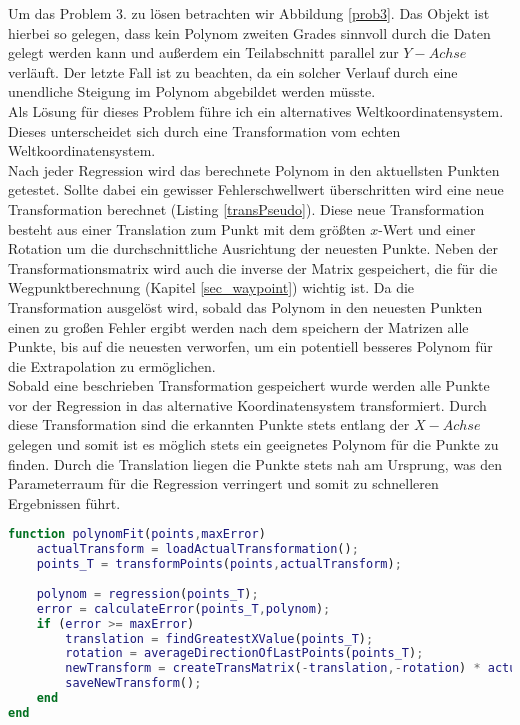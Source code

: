 Um das Problem 3. zu lösen betrachten wir Abbildung \ref{prob3}. Das Objekt ist hierbei so gelegen, dass kein Polynom zweiten Grades sinnvoll durch die Daten gelegt werden kann und außerdem ein Teilabschnitt parallel zur $Y-Achse$ verläuft. Der letzte Fall ist zu beachten, da ein solcher Verlauf durch eine unendliche Steigung im Polynom abgebildet werden müsste.\\
Als Lösung für dieses Problem führe ich ein alternatives Weltkoordinatensystem. Dieses unterscheidet sich durch eine Transformation vom echten Weltkoordinatensystem.\\
Nach jeder Regression wird das berechnete Polynom in den aktuellsten Punkten getestet. Sollte dabei ein gewisser Fehlerschwellwert überschritten wird eine neue Transformation berechnet (Listing \ref{transPseudo}). Diese neue Transformation besteht aus einer Translation zum Punkt mit dem größten $x$-Wert und einer Rotation um die durchschnittliche Ausrichtung der neuesten Punkte. Neben der Transformationsmatrix wird auch die inverse der Matrix gespeichert, die für die Wegpunktberechnung (Kapitel \ref{sec_waypoint}) wichtig ist. Da die Transformation ausgelöst wird, sobald das Polynom in den neuesten Punkten einen zu großen Fehler ergibt werden nach dem speichern der Matrizen alle Punkte, bis auf die neuesten verworfen, um ein potentiell besseres Polynom für die Extrapolation zu ermöglichen.\\
Sobald eine beschrieben Transformation gespeichert wurde werden alle Punkte vor der Regression in das alternative Koordinatensystem transformiert. Durch diese Transformation sind die erkannten Punkte stets entlang der $X-Achse$ gelegen und somit ist es möglich stets ein geeignetes Polynom für die Punkte zu finden. Durch die Translation liegen die Punkte stets nah am Ursprung, was den Parameterraum für die Regression verringert und somit zu schnelleren Ergebnissen führt.
\begin{lstlisting}[language=Matlab,caption=Pseudocode des Schätzverfahrens,label=transPseudo]
function polynomFit(points,maxError)
	actualTransform = loadActualTransformation();
	points_T = transformPoints(points,actualTransform);
	
	polynom = regression(points_T);
	error = calculateError(points_T,polynom);
	if (error >= maxError)
		translation = findGreatestXValue(points_T);
		rotation = averageDirectionOfLastPoints(points_T);
		newTransform = createTransMatrix(-translation,-rotation) * actualTransform;
		saveNewTransform();
	end
end
\end{lstlisting}



